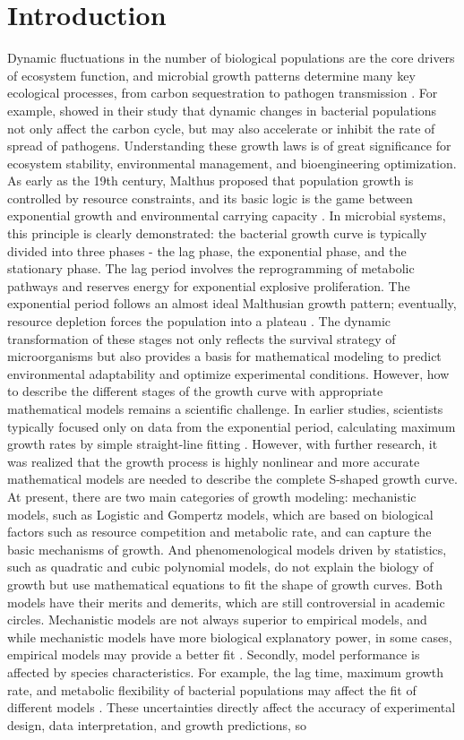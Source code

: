 \documentclass[11pt]{article}
\begin{document}
\section{Introduction}
Dynamic fluctuations in the number of biological populations are the core drivers of ecosystem function, and microbial growth patterns determine many key ecological processes, from carbon sequestration to pathogen transmission \citep{Sokol2022}. For example, \citet{Nguyen2021} showed in their study that dynamic changes in bacterial populations not only affect the carbon cycle, but may also accelerate or inhibit the rate of spread of pathogens. Understanding these growth laws is of great significance for ecosystem stability, environmental management, and bioengineering optimization. As early as the 19th century, Malthus proposed that population growth is controlled by resource constraints, and its basic logic is the game between exponential growth and environmental carrying capacity \citep{Pender1998}. In microbial systems, this principle is clearly demonstrated: the bacterial growth curve is typically divided into three phases - the lag phase, the exponential phase, and the stationary phase. The lag period involves the reprogramming of metabolic pathways and reserves energy for exponential explosive proliferation. The exponential period follows an almost ideal Malthusian growth pattern; eventually, resource depletion forces the population into a plateau \citep{Broswimmer1999}. The dynamic transformation of these stages not only reflects the survival strategy of microorganisms but also provides a basis for mathematical modeling to predict environmental adaptability and optimize experimental conditions. However, how to describe the different stages of the growth curve with appropriate mathematical models remains a scientific challenge. In earlier studies, scientists typically focused only on data from the exponential period, calculating maximum growth rates by simple straight-line fitting \citep{Motulsky2004}. However, with further research, it was realized that the growth process is highly nonlinear and more accurate mathematical models are needed to describe the complete S-shaped growth curve. At present, there are two main categories of growth modeling: mechanistic models, such as Logistic and Gompertz models, which are based on biological factors such as resource competition and metabolic rate, and can capture the basic mechanisms of growth. And phenomenological models driven by statistics, such as quadratic and cubic polynomial models, do not explain the biology of growth but use mathematical equations to fit the shape of growth curves. Both models have their merits and demerits, which are still controversial in academic circles. Mechanistic models are not always superior to empirical models, and while mechanistic models have more biological explanatory power, in some cases, empirical models may provide a better fit \citep{OConnor2007}. Secondly, model performance is affected by species characteristics. For example, the lag time, maximum growth rate, and metabolic flexibility of bacterial populations may affect the fit of different models \citep{MorenoGamez2020}. These uncertainties directly affect the accuracy of experimental design, data interpretation, and growth predictions, so 
\end{document}
